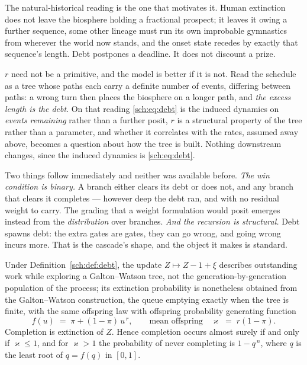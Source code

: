 The natural-historical reading is the one that motivates it. Human
extinction does not leave the biosphere holding a fractional prospect;
it leaves it owing a further sequence, some other lineage must run
its own improbable gymnastics from wherever the world now stands, and
the onset state recedes by exactly that sequence's length. Debt
postpones a deadline. It does not discount a prize.

$r$ need not be a primitive, and the model is better if it is not. Read
the schedule as a tree whose paths each carry a definite number of
events, differing between paths: a wrong turn then places the biosphere
on a longer path, and \emph{the excess length is the debt}. On that
reading \eqref{sch:eq:debt} is the induced dynamics on \emph{events
remaining} rather than a further posit, $r$ is a structural property of
the tree rather than a parameter, and whether it correlates with the
rates, assumed away above, becomes a question about how the tree
is built. Nothing downstream changes, since the induced dynamics is
\eqref{sch:eq:debt}.

Two things follow immediately and neither was available before. \emph{The win condition is binary.} A branch either clears its debt or
does not, and any branch that clears it completes --- however deep the
debt ran, and with no residual weight to carry. The grading that a
weight formulation would posit emerges instead from the
\emph{distribution} over branches. \emph{And the recursion is structural.} Debt spawns debt: the extra
gates are gates, they can go wrong, and going wrong incurs more. That is
the cascade's shape, and the object it makes is standard.

\begin{proposition} \label{sch:prop:gw} Under Definition~\ref{sch:def:debt}, the update $Z \mapsto Z - 1 + \xi$ describes outstanding work while exploring a Galton--Watson tree, not the generation-by-generation population of the process; its extinction probability is nonetheless obtained from the Galton--Watson construction, the queue emptying exactly when the tree is finite, with the same offspring law with offspring probability generating function
\begin{equation}\label{sch:eq:pgf}
f(u)\;=\;\pi+(1-\pi)\,u^{\,r},
\qquad\text{mean offspring}\quad \varkappa\;=\;r(1-\pi).
\end{equation}
Completion is extinction of $Z$. Hence completion occurs almost surely
if and only if $\varkappa\le1$, and for $\varkappa>1$ the probability of never
completing is $1-q^{\,n}$, where $q$ is the least root of $q=f(q)$ in
$[0,1]$.
\end{proposition}

